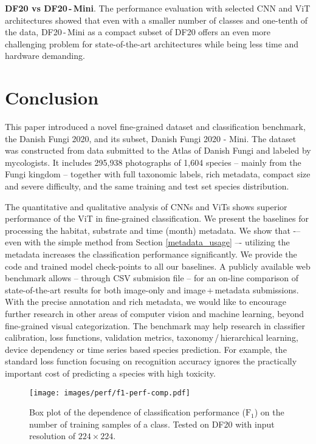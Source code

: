 \documentclass[10pt,twocolumn,letterpaper]{article}
\begin{document}
\textbf{DF20 vs DF20\,-\,Mini}. The performance evaluation with selected CNN and ViT architectures showed that even with a smaller number of classes and one-tenth of the data, DF20\,-\,Mini as a compact subset of DF20 offers an even more challenging problem for state-of-the-art architectures while being less time and hardware demanding.


\section{Conclusion}

This paper introduced a novel fine-grained dataset and classification benchmark, the Danish Fungi 2020, and its subset, Danish Fungi 2020 - Mini. 
The dataset was constructed from data submitted to the Atlas of Danish Fungi and labeled by mycologists. It includes 295,938 photographs of 1,604 species -- mainly from the Fungi kingdom -- together with full taxonomic labels, rich metadata, compact size and severe difficulty, and the same training and test set species distribution.

The quantitative and qualitative analysis of CNNs and ViTs shows superior performance of the ViT in fine-grained classification. We present the baselines for processing the habitat, substrate and time (month) metadata. We show that -– even with the simple method from Section \ref{metadata_usage} –- utilizing the metadata increases the classification performance significantly. We provide the code and trained model check-points to all our baselines. 
A publicly available web benchmark allows -- through CSV submision file -- for an on-line comparison of state-of-the-art results for both image-only and image\,+\,metadata submissions. With the precise annotation and rich metadata, we would like to encourage further research in other areas of computer vision and machine learning, beyond fine-grained visual categorization. The benchmark may help research in classifier calibration, loss functions, validation metrics, taxonomy\,/\,hierarchical learning, device dependency or time series based species prediction. For example, the standard loss function focusing on recognition accuracy ignores the practically important cost of predicting a species with high toxicity. 

\begin{figure}[t!]
\begin{center}
\texttt{[image: images/perf/f1-perf-comp.pdf]}
\caption{Box plot of the dependence of classification performance ($\text{F}_{1}$) on the number of training samples of a class. Tested on DF20 with input resolution of $224\times224$.}
\label{fig:perf_comp}
\end{center}
\end{figure}








{\small


}
\end{document}
